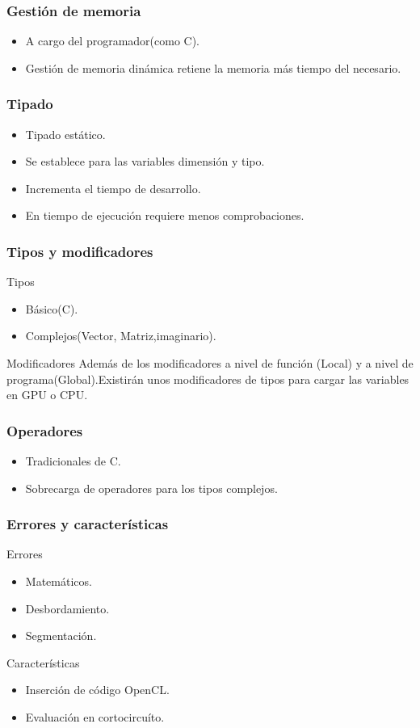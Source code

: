 \documentclass{beamer}
\begin{document}
\begin{frame}
\frametitle{Gestión de memoria}
\begin{itemize}
\item A cargo del programador(como C).
\item Gestión de memoria dinámica retiene la memoria
más tiempo del necesario.
\end{itemize}
\end{frame}
\begin{frame}
\frametitle{Tipado}
\begin{itemize}
\item Tipado estático.
\item Se establece para las variables dimensión y tipo.
\item Incrementa el tiempo de desarrollo.
\item En tiempo de ejecución requiere menos comprobaciones.
\end{itemize}
\end{frame}
\begin{frame}
\frametitle{Tipos y modificadores}
\begin{block}{Tipos}
\begin{itemize}
\item Básico(C).
\item Complejos(Vector, Matriz,imaginario).
\end{itemize}
\end{block}
\pause
\begin{block}{Modificadores}
Además de los modificadores a nivel de función (Local) y a nivel de programa(Global).Existirán unos modificadores de tipos para cargar las variables en GPU o CPU.
\end{block}
\end{frame}
\begin{frame}
\frametitle{Operadores}
\begin{itemize}
\item Tradicionales de C.
\item Sobrecarga de operadores para los tipos complejos.
\end{itemize}
\end{frame}
\begin{frame}
\frametitle{Errores y características}
\begin{block}{Errores}
\begin{itemize}
\item Matemáticos.
\item Desbordamiento.
\item Segmentación.
\end{itemize}
\end{block}
\pause
\begin{block}{Características}
\begin{itemize}
\item Inserción de código OpenCL.
\item Evaluación en cortocircuíto.
\end{itemize}
\end{block}
\end{frame}
\end{document}
